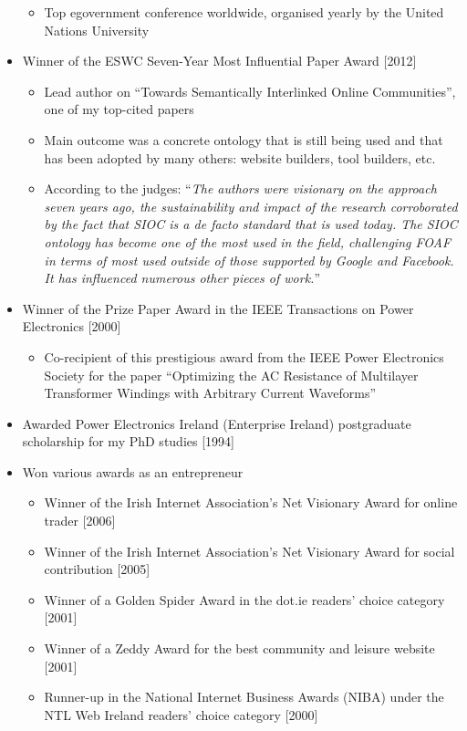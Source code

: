 \documentclass[10pt,a4paper]{res} %
\begin{document}
\begin{resume}
\begin{itemize}
\begin{itemize}
\item Top egovernment conference worldwide, organised yearly by the United Nations University
\end{itemize}
\item Winner of the ESWC Seven-Year Most Influential Paper Award [2012]
\begin{itemize} \itemsep -2pt
\item Lead author on ``Towards Semantically Interlinked Online Communities'', one of my top-cited papers
\item Main outcome was a concrete ontology that is still being used and that has been adopted by many others: website builders, tool builders, etc.
\item According to the judges: ``\textit{The authors were visionary on the approach seven years ago, the sustainability and impact of the research corroborated by the fact that SIOC is a de facto standard that is used today. The SIOC ontology has become one of the most used in the field, challenging FOAF in terms of most used outside of those supported by Google and Facebook. It has influenced numerous other pieces of work.}''
\end{itemize}
\item Winner of the Prize Paper Award in the IEEE Transactions on Power Electronics [2000]
\begin{itemize} \itemsep -2pt
\item Co-recipient of this prestigious award from the IEEE Power Electronics Society for the paper ``Optimizing the AC Resistance of Multilayer Transformer Windings with Arbitrary Current Waveforms''
\end{itemize}
\item Awarded Power Electronics Ireland (Enterprise Ireland) postgraduate scholarship for my PhD studies [1994]
\item Won various awards as an entrepreneur
\begin{itemize} \itemsep -2pt
\item Winner of the Irish Internet Association's Net Visionary Award for online trader [2006]
\item Winner of the Irish Internet Association's Net Visionary Award for social contribution [2005]
\item Winner of a Golden Spider Award in the dot.ie readers' choice category [2001]
\item Winner of a Zeddy Award for the best community and leisure website [2001]
\item Runner-up in the National Internet Business Awards (NIBA) under the NTL Web Ireland readers' choice category [2000]
\end{itemize}
\end{itemize}


\end{resume}
\end{document}
